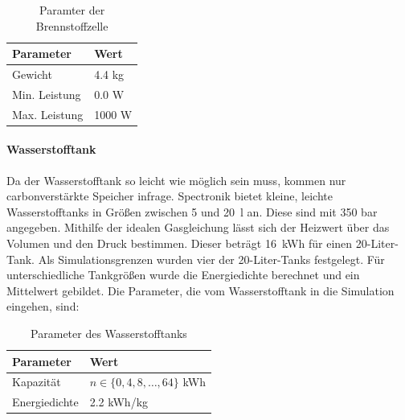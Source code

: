 \begin{table}[h]
\centering
\begin{tabular}{|l|l|}
\hline
\textbf{Parameter} & \textbf{Wert} \\ \hline
Gewicht & 4.4 kg \\ \hline
Min. Leistung & 0.0 W \\ \hline
Max. Leistung & 1000 W \\ \hline
\end{tabular}
\caption{Paramter der Brennstoffzelle \cite{FC-katalog}}
\end{table}

\paragraph{Wasserstofftank}
Da der Wasserstofftank so leicht wie möglich sein muss, kommen nur carbonverstärkte Speicher infrage. Spectronik bietet kleine, leichte Wasserstofftanks in Größen zwischen 5 und 20~l an. Diese sind mit 350 bar angegeben. Mithilfe der idealen Gasgleichung lässt sich der Heizwert über das Volumen und den Druck bestimmen. Dieser beträgt 16~kWh für einen 20-Liter-Tank. Als Simulationsgrenzen wurden vier der 20-Liter-Tanks festgelegt. Für unterschiedliche Tankgrößen wurde die Energiedichte berechnet und ein Mittelwert gebildet. Die Parameter, die vom Wasserstofftank in die Simulation eingehen, sind: 

\begin{table}[h]
\centering
\begin{tabular}{|l|l|}
\hline
\textbf{Parameter} & \textbf{Wert} \\ \hline
Kapazität & $ n \in \{0,4,8,\dots,64\}$ kWh \\ \hline
Energiedichte & 2.2 kWh/kg \\ \hline
\end{tabular}
\caption{Parameter des Wasserstofftanks \cite{TankH2}}
\end{table}

